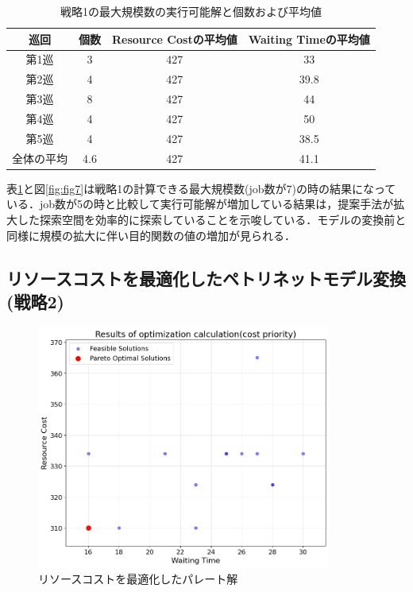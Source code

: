 \begin{table}[ht]
    \centering
    \vspace{-0.3cm}
    \caption{戦略1の最大規模数の実行可能解と個数および平均値}
    \begin{tabular}{|c|c|c|c|}
        \hline
         巡回 & 個数 & Resource Costの平均値 & Waiting Timeの平均値 \\
        \hline
        第1巡 & 3 & 427 & 33 \\
        \hline
        第2巡 & 4 & 427 & 39.8 \\
        \hline
        第3巡 & 8 & 427 & 44 \\
        \hline
        第4巡 & 4 & 427 & 50 \\
        \hline
        第5巡 & 4 & 427 & 38.5 \\
        \hline
        全体の平均 & 4.6 & 427 & 41.1 \\
        \hline
    \end{tabular}
    \label{tab:task_feasible_max}
\end{table}

表\ref{tab:task_feasible_max}と図\ref{fig:fig7}は戦略1の計算できる最大規模数(job数が7)の時の結果になっている．job数が5の時と比較して実行可能解が増加している結果は，提案手法が拡大した探索空間を効率的に探索していることを示唆している．モデルの変換前と同様に規模の拡大に伴い目的関数の値の増加が見られる．
 
\subsection{リソースコストを最適化したペトリネットモデル変換(戦略2)}

\begin{figure}[H]
    \centering
    \includegraphics[width=0.8\linewidth, height=8cm]{./images/cost_job5.png}
    \caption{リソースコストを最適化したパレート解}
    \label{fig:fig8}
\end{figure}
\clearpage

